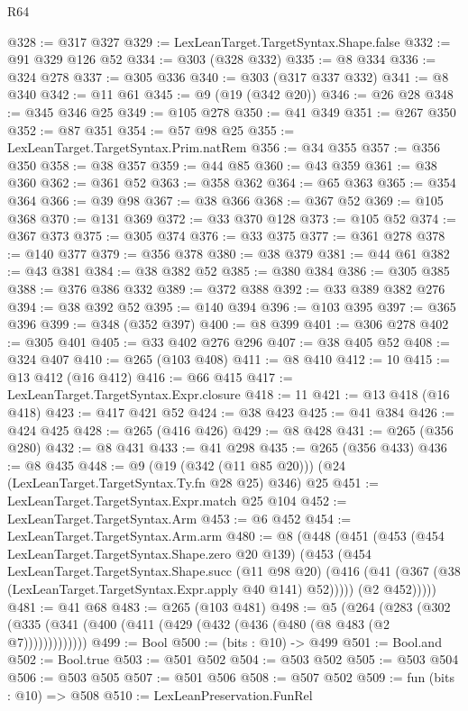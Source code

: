 \begin{lexlean}{R64}
\begin{coremodule}
@328 := @317 @327
@329 := LexLeanTarget.TargetSyntax.Shape.false
@332 := @91 @329 @126 @52
@334 := @303 (@328 @332)
@335 := @8 @334
@336 := @324 @278
@337 := @305 @336
@340 := @303 (@317 @337 @332)
@341 := @8 @340
@342 := @11 @61
@345 := @9 (@19 (@342 @20))
@346 := @26 @28
@348 := @345 @346 @25
@349 := @105 @278
@350 := @41 @349
@351 := @267 @350
@352 := @87 @351
@354 := @57 @98 @25
@355 := LexLeanTarget.TargetSyntax.Prim.natRem
@356 := @34 @355
@357 := @356 @350
@358 := @38 @357
@359 := @44 @85
@360 := @43 @359
@361 := @38 @360
@362 := @361 @52
@363 := @358 @362
@364 := @65 @363
@365 := @354 @364
@366 := @39 @98
@367 := @38 @366
@368 := @367 @52
@369 := @105 @368
@370 := @131 @369
@372 := @33 @370 @128
@373 := @105 @52
@374 := @367 @373
@375 := @305 @374
@376 := @33 @375
@377 := @361 @278
@378 := @140 @377
@379 := @356 @378
@380 := @38 @379
@381 := @44 @61
@382 := @43 @381
@384 := @38 @382 @52
@385 := @380 @384
@386 := @305 @385
@388 := @376 @386 @332
@389 := @372 @388
@392 := @33 @389 @382 @276
@394 := @38 @392 @52
@395 := @140 @394
@396 := @103 @395
@397 := @365 @396
@399 := @348 (@352 @397)
@400 := @8 @399
@401 := @306 @278
@402 := @305 @401
@405 := @33 @402 @276 @296
@407 := @38 @405 @52
@408 := @324 @407
@410 := @265 (@103 @408)
@411 := @8 @410
@412 := 10
@415 := @13 @412 (@16 @412)
@416 := @66 @415
@417 := LexLeanTarget.TargetSyntax.Expr.closure
@418 := 11
@421 := @13 @418 (@16 @418)
@423 := @417 @421 @52
@424 := @38 @423
@425 := @41 @384
@426 := @424 @425
@428 := @265 (@416 @426)
@429 := @8 @428
@431 := @265 (@356 @280)
@432 := @8 @431
@433 := @41 @298
@435 := @265 (@356 @433)
@436 := @8 @435
@448 := @9 (@19 (@342 (@11 @85 @20))) (@24 (LexLeanTarget.TargetSyntax.Ty.fn @28 @25) @346) @25
@451 := LexLeanTarget.TargetSyntax.Expr.match @25 @104
@452 := LexLeanTarget.TargetSyntax.Arm
@453 := @6 @452
@454 := LexLeanTarget.TargetSyntax.Arm.arm
@480 := @8
    (@448
      (@451
        (@453
          (@454 LexLeanTarget.TargetSyntax.Shape.zero @20 @139)
          (@453
            (@454
              LexLeanTarget.TargetSyntax.Shape.succ
              (@11 @98 @20)
              (@416 (@41 (@367 (@38 (LexLeanTarget.TargetSyntax.Expr.apply @40 @141) @52)))))
            (@2 @452)))))
@481 := @41 @68
@483 := @265 (@103 @481)
@498 := @5
    (@264 (@283 (@302 (@335 (@341 (@400 (@411 (@429 (@432 (@436 (@480 (@8 @483 (@2 @7)))))))))))))
@499 := Bool
@500 := (bits : @10) -> @499
@501 := Bool.and
@502 := Bool.true
@503 := @501 @502
@504 := @503 @502
@505 := @503 @504
@506 := @503 @505
@507 := @501 @506
@508 := @507 @502
@509 := fun (bits : @10) => @508
@510 := LexLeanPreservation.FunRel

\end{coremodule}
\end{lexlean}
